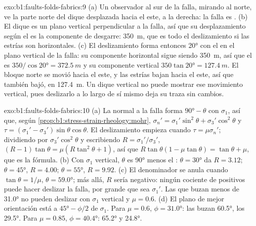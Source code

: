 \begin{solution}{exo:b1:faults-folds-fabrics:9}
(a) Un observador al sur de la falla, mirando al norte, ve la parte norte del dique desplazada hacia el este, a la derecha: la falla es
. (b) El dique es un plano vertical perpendicular a la falla, así que su desplazamiento según el  es la componente de
desgarre: \qty{350}{m}, que es todo el deslizamiento si las estrías son horizontales. (c) El deslizamiento forma entonces \ang{20} con
el  en el plano vertical de la falla: su componente horizontal sigue siendo \qty{350}{m}, así que el  es
$350/\cos\ang{20} = \qty{372.5}{m}$ y su componente vertical $350\tan\ang{20} = \qty{127.4}{m}$. El bloque norte se movió hacia el este, y
las estrías bajan hacia el este, así que también bajó, en \qty{127.4}{m}. Un dique vertical no puede mostrar ese movimiento vertical,
pues deslizarlo a lo largo de sí mismo deja su traza sin cambios.
\end{solution}

\begin{solution}{exo:b1:faults-folds-fabrics:10}
(a) La normal a la falla forma $\ang{90} - \theta$ con $\sigma_1$, así que, según
\cref{prop:b1:stress-strain-rheology:mohr},
$\sigma_n' = \sigma_1'\sin^2\theta + \sigma_3'\cos^2\theta$ y
$\tau = (\sigma_1' - \sigma_3')\sin\theta\cos\theta$. El deslizamiento empieza
cuando $\tau = \mu\sigma_n'$; dividiendo por $\sigma_3'\cos^2\theta$ y escribiendo
$R = \sigma_1'/\sigma_3'$, $(R - 1)\tan\theta = \mu(R\tan^2\theta + 1)$, así que
$R\tan\theta(1 - \mu\tan\theta) = \tan\theta + \mu$, que es la fórmula.
(b) Con $\sigma_1$ vertical, $\theta$ es \ang{90} menos el :
$\theta = \ang{30}$ da $R = 3.12$; $\theta = \ang{45}$, $R = 4.00$;
$\theta = \ang{55}$, $R = 9.92$. (c) El denominador se anula cuando
$\tan\theta = 1/\mu$, $\theta = \ang{59.0}$; más allá, $R$ sería negativo:
ningún cociente de  positivos puede hacer deslizar la falla, por grande que sea
$\sigma_1'$. Las  que buzan menos de \ang{31.0} no pueden deslizar
con $\sigma_1$ vertical y $\mu = 0.6$. (d) El plano de mejor orientación está a
$\ang{45} - \phi/2$ de $\sigma_1$. Para $\mu = 0.6$, $\phi = \ang{31.0}$:
las  buzan \ang{60.5}, los  \ang{29.5}. Para $\mu = 0.85$,
$\phi = \ang{40.4}$: \ang{65.2} y \ang{24.8}.
\end{solution}

